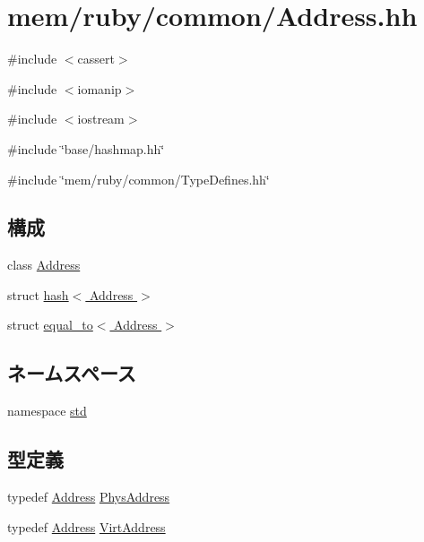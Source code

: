 \hypertarget{Address_8hh}{
\section{mem/ruby/common/Address.hh}
\label{Address_8hh}
}
{\ttfamily \#include $<$cassert$>$}\par
{\ttfamily \#include $<$iomanip$>$}\par
{\ttfamily \#include $<$iostream$>$}\par
{\ttfamily \#include \char`\"{}base/hashmap.hh\char`\"{}}\par
{\ttfamily \#include \char`\"{}mem/ruby/common/TypeDefines.hh\char`\"{}}\par
\subsection*{構成}
\begin{DoxyCompactItemize}
\item 
class \hyperlink{classAddress}{Address}
\item 
struct \hyperlink{structhash_3_01Address_01_4}{hash$<$ Address $>$}
\item 
struct \hyperlink{structstd_1_1equal__to_3_01Address_01_4}{equal\_\-to$<$ Address $>$}
\end{DoxyCompactItemize}
\subsection*{ネームスペース}
\begin{DoxyCompactItemize}
\item 
namespace \hyperlink{namespacestd}{std}
\end{DoxyCompactItemize}
\subsection*{型定義}
\begin{DoxyCompactItemize}
\item 
typedef \hyperlink{classAddress}{Address} \hyperlink{Address_8hh_a1572cc21e068a948c429d76aff2cb368}{PhysAddress}
\item 
typedef \hyperlink{classAddress}{Address} \hyperlink{Address_8hh_abb5304a7395a6cbcf21dd679354a6593}{VirtAddress}
\end{DoxyCompactItemize}
